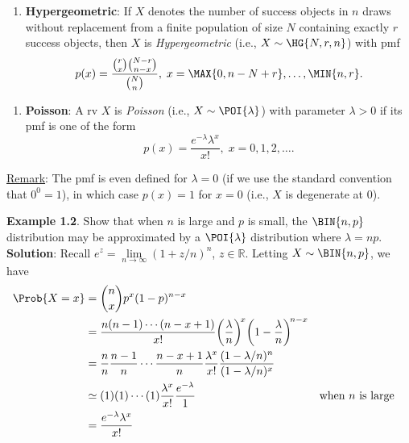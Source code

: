 \begin{Regular}
    \begin{enumerate}[6.]
        \item \textbf{Hypergeometric}: If $ X $ denotes the number of success objects in $ n $ draws without
              replacement from a finite population of size $ N $ containing exactly $ r $ success objects, then $ X $ is
              \emph{Hypergeometric} (i.e., $ X \sim \HG{N,r,n}$) with pmf
              \[ p(x)=\frac{\binom{r}{x}\binom{N-r}{n-x}}{\binom{N}{n}},\;x=\MAX{0,n-N+r},\ldots,\MIN{n,r}.  \]
    \end{enumerate}
\end{Regular}
\begin{Regular}
    \begin{enumerate}[7.]
        \item \textbf{Poisson}: A rv $ X $ is \emph{Poisson} (i.e., $ X \sim \POI{\lambda} $) with parameter $ \lambda>0 $ if its pmf is one of the form
              \[ p(x)=\frac{e^{-\lambda}\lambda^x}{x!},\;x=0,1,2,\ldots.  \]
    \end{enumerate}
    \tcblower{}
    \underline{Remark}: The pmf is even defined for $ \lambda=0 $ (if we use the standard convention that $ 0^0=1 $), in which case $ p(x)=1 $ for $ x=0 $
    (i.e., $ X $ is degenerate at $ 0 $).
\end{Regular}
\begin{Example}
    \textbf{Example 1.2}. Show that when $ n $ is large and $ p $ is small, the $ \BIN{n,p} $ distribution may be approximated by a
    $ \POI{\lambda} $ distribution where $ \lambda=np $.
    \tcblower{}
    \textbf{Solution}:
    Recall $ e^z=\lim\limits_{{n} \to {\infty}} (1+z/n)^n $, $ z\in\mathbb{R} $. Letting $ X \sim \BIN{n,p} $, we have
    \begin{align*}
        \Prob{X=x}
         & =\binom{n}{x}p^x(1-p)^{n-x}                                                                                                                      \\
         & =\frac{n(n-1)\cdots(n-x+1)}{x!}\biggl(\frac{\lambda}{n} \biggr)^{\!x} \biggl(1-\frac{\lambda}{n} \biggr)^{\!n-x}                                 \\
         & =\frac{n}{n}\frac{n-1}{n}\cdots \frac{n-x+1}{n} \frac{\lambda^x}{x!} \frac{(1-\lambda/n)^n}{(1-\lambda/n)^x}                                     \\
         & \simeq (1)(1)\cdots(1)\frac{\lambda^x}{x!}\frac{e^{-\lambda}}{1}                                                 &  & \text{when $ n $ is large} \\
         & =\frac{e^{-\lambda}\lambda^x}{x!}
    \end{align*}
\end{Example}
